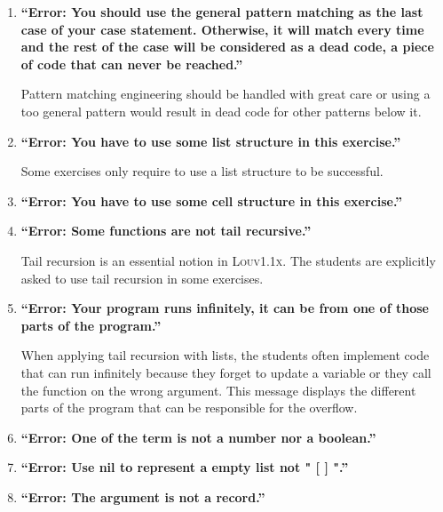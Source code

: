 \documentclass[11pt,a4paper,twoside,openright]{report}
\begin{document}
\begin{enumerate}
\item \textbf{\enquote{Error: You should use the general pattern matching as the last 
case of your case statement. Otherwise, it will match every time and the rest of 
the case will be considered as a dead code, a piece of code that can never 
be reached.}} 

Pattern matching engineering should be handled with great care or using a too 
general pattern would result in dead code for other patterns below it.
 
\item \textbf{\enquote{Error: You have to use some list structure in this exercise.}} 

Some exercises only require to use a list structure to be successful.

\item \textbf{\enquote{Error: You have to use some cell structure in this exercise.}}

\item \textbf{\enquote{Error: Some functions are not tail recursive.}} 

Tail recursion is an essential notion in \textsc{Louv1.1x}. The students are 
explicitly asked to use tail recursion in some exercises.

\item \textbf{\enquote{Error: Your program runs infinitely, it can be from one of 
those parts of the program.}}

When applying tail recursion with lists, the students often implement code that 
can run infinitely because they forget to update a variable or they call the 
function on the wrong argument. This message displays the different parts of 
the 
program that can be responsible for the overflow.

\item \textbf{\enquote{Error: One of the term is not a number nor a boolean.}}

\item \textbf{\enquote{Error: Use nil to represent a empty list not " [ ] ".}}

\item \textbf{\enquote{Error: The argument is not a record.}}
\end{enumerate}
\end{document}
